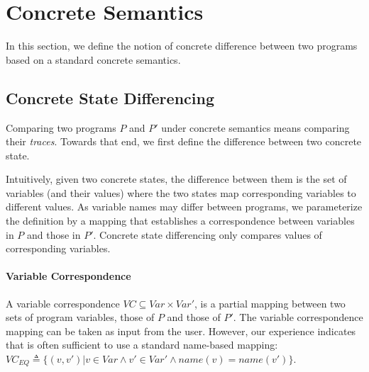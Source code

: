 \section{Concrete Semantics}
In this section, we define the notion of concrete difference between two programs based on a standard concrete semantics.

\subsection{Concrete State Differencing}
Comparing two programs $P$ and $P'$ under concrete semantics means comparing their \emph{traces}. Towards that end, we first define the difference between two concrete state. 

Intuitively, given two concrete states, the difference between them is the set of variables (and their values) where the two states map corresponding variables to different values. As variable names may differ between programs, we parameterize the definition by a mapping that establishes a correspondence between variables in $P$ and those in $P'$. Concrete state differencing only compares values of corresponding variables. 

\paragraph{Variable Correspondence} 
A variable correspondence $VC \subseteq Var \times Var'$, is a partial mapping between two sets of program variables, those of $P$ and those of $P'$. The variable correspondence mapping can be taken as input from the user. However, our experience indicates that is often sufficient to use a standard name-based mapping:  $VC_{EQ} \triangleq \{(v,v') | v \in Var \wedge v' \in Var' \wedge name(v) = name(v')\}$. 






